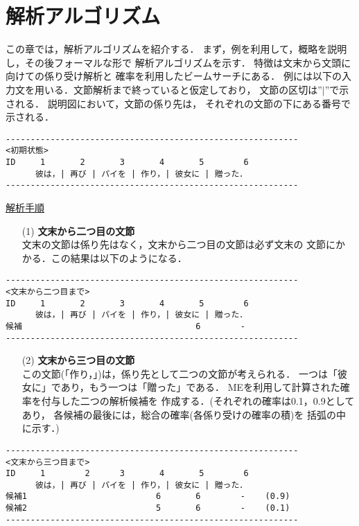 \section{解析アルゴリズム}

この章では，解析アルゴリズムを紹介する．
まず，例を利用して，概略を説明し，その後フォーマルな形で
解析アルゴリズムを示す．
特徴は文末から文頭に向けての係り受け解析と
確率を利用したビームサーチにある．
例には以下の入力文を用いる．文節解析まで終っていると仮定しており，
文節の区切は''$|$''で示される．
説明図において，文節の係り先は，
それぞれの文節の下にある番号で示される．
\begin{verbatim}
-----------------------------------------------------------
<初期状態>
ID     1       2       3       4       5        6
      彼は，| 再び | パイを | 作り，| 彼女に | 贈った．
-----------------------------------------------------------
\end{verbatim}
\begin{flushleft}
\underline{解析手順}
\end{flushleft}
\begin{enumerate}
\item[(1)] {\bf 文末から二つ目の文節} \\
  文末の文節は係り先はなく，文末から二つ目の文節は必ず文末の
  文節にかかる．この結果は以下のようになる．
\end{enumerate}
\begin{verbatim}
-----------------------------------------------------------
<文末から二つ目まで>
ID     1       2       3       4       5        6
      彼は，| 再び | パイを | 作り，| 彼女に | 贈った．
候補                                   6        -
-----------------------------------------------------------
\end{verbatim}
\begin{enumerate}
\item[(2)] {\bf 文末から三つ目の文節} \\
  この文節(「作り，」)は，係り先として二つの文節が考えられる．
  一つは「彼女に」であり，もう一つは「贈った」である．
  MEを利用して計算された確率を付与した二つの解析候補を
  作成する．(それぞれの確率は0.1，0.9としてあり，
  各候補の最後には，総合の確率(各係り受けの確率の積)を
  括弧の中に示す．)
\end{enumerate}
\begin{verbatim}
-----------------------------------------------------------
<文末から三つ目まで>
ID     1        2      3       4       5        6
      彼は，| 再び | パイを | 作り，| 彼女に | 贈った．
候補1                          6       6        -    (0.9)
候補2                          5       6        -    (0.1)
-----------------------------------------------------------
\end{verbatim}
